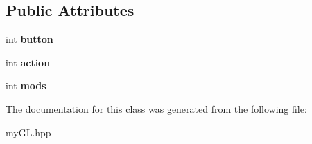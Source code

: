 \subsection*{Public Attributes}
\begin{DoxyCompactItemize}
\item 
int {\bfseries button}\hypertarget{classMouseButton_ada6d6e1d81eaedf7092a8617af6ede6b}{}\label{classMouseButton_ada6d6e1d81eaedf7092a8617af6ede6b}

\item 
int {\bfseries action}\hypertarget{classMouseButton_a7f22ddcecc4bfe282f7c8b150e28704b}{}\label{classMouseButton_a7f22ddcecc4bfe282f7c8b150e28704b}

\item 
int {\bfseries mods}\hypertarget{classMouseButton_a1fa333819593583ccc090db9330018ad}{}\label{classMouseButton_a1fa333819593583ccc090db9330018ad}

\end{DoxyCompactItemize}


The documentation for this class was generated from the following file\+:\begin{DoxyCompactItemize}
\item 
my\+G\+L.\+hpp\end{DoxyCompactItemize}
